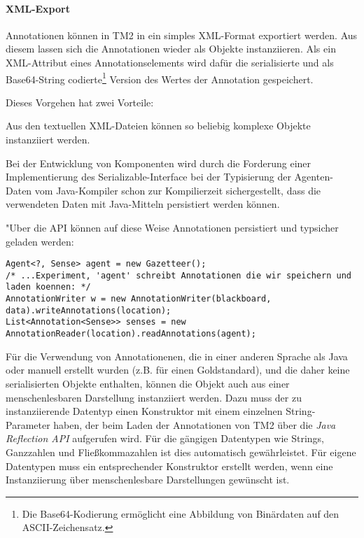 \documentclass[abstracton, 12pt]{scrartcl}
\begin{document}
\paragraph{XML-Export} \label{impl-xml}

Annotationen können in TM2 in ein simples XML-Format exportiert werden. Aus diesem lassen sich die Annotationen wieder als Objekte instanziieren. Als ein XML-Attribut eines Annotationselements wird dafür die serialisierte und als Base64-String codierte\footnote{Die Base64-Kodierung ermöglicht eine Abbildung von Binärdaten auf den ASCII-Zeichensatz.} Version des Wertes der Annotation gespeichert.

Dieses Vorgehen hat zwei Vorteile: \begin{inparaenum}
  \item Aus den textuellen XML-Dateien können so beliebig komplexe Objekte instanziiert werden.
  \item Bei der Entwicklung von Komponenten wird durch die Forderung einer Implementierung des Serializable-Interface bei der Typisierung der Agenten-Daten vom Java-Kompiler schon zur Kompilierzeit sichergestellt, dass die verwendeten Daten mit Java-Mitteln persistiert werden können.
\end{inparaenum} 

"Uber die API können auf diese Weise Annotationen persistiert und typsicher geladen werden:

\begin{lstlisting}
Agent<?, Sense> agent = new Gazetteer(); 
/* ...Experiment, 'agent' schreibt Annotationen die wir speichern und laden koennen: */
AnnotationWriter w = new AnnotationWriter(blackboard, data).writeAnnotations(location);
List<Annotation<Sense>> senses = new AnnotationReader(location).readAnnotations(agent);
\end{lstlisting}

Für die Verwendung von Annotationenen, die in einer anderen Sprache als Java oder manuell erstellt wurden (z.B. für einen Goldstandard), und die daher keine serialisierten Objekte enthalten, können die Objekt auch aus einer menschenlesbaren Darstellung instanziiert werden. Dazu muss der zu instanziierende Datentyp einen Konstruktor mit einem einzelnen String-Parameter haben, der beim Laden der Annotationen von TM2 über die \emph{Java Reflection API} aufgerufen wird. Für die gängigen Datentypen wie Strings, Ganzzahlen und Fließkommazahlen ist dies automatisch gewährleistet. Für eigene Datentypen muss ein entsprechender Konstruktor erstellt werden, wenn eine Instanziierung über menschenlesbare Darstellungen gewünscht ist.
\end{document}

